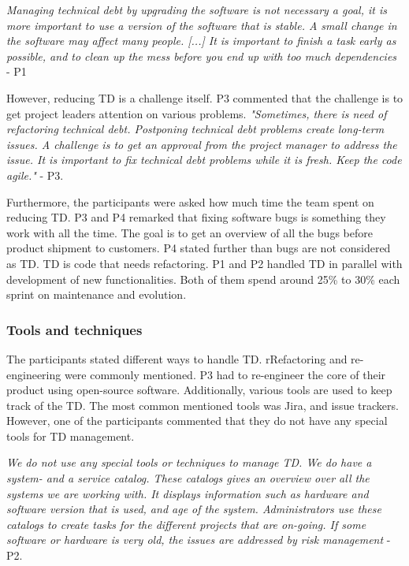 \begin{displayquote}
\textit{Managing technical debt by upgrading the software is not necessary a goal, it is more important to use a version of the software that is stable.  A small change in the software may affect many people. [...] It is important to finish a task early as possible, and to clean up the mess before you end up with too much dependencies} - P1
\end{displayquote}

However, reducing TD is a challenge itself. P3 commented that the challenge is to get project leaders attention on various problems. \textit{"Sometimes, there is need of refactoring technical debt. Postponing technical debt problems create long-term issues. A challenge is to get an approval from the project manager to address the issue. It is important to fix technical debt problems while it is fresh. Keep the code agile."} - P3. 

Furthermore, the participants were asked how much time the team spent on reducing TD. P3 and P4 remarked that fixing software bugs is something they work with all the time. The goal is to get an overview of all the bugs before product shipment to customers. P4 stated further than bugs are not considered as TD. TD is code that needs refactoring. P1 and P2 handled TD in parallel with development of new functionalities. Both of them spend around 25\% to 30\% each sprint on maintenance and evolution.


\subsubsection{Tools and techniques}
The participants stated different ways to handle TD. rRefactoring and re-engineering were commonly mentioned. P3 had to re-engineer the core of their product using open-source software. Additionally, various tools are used to keep track of the TD. The most common mentioned tools was Jira, and issue trackers. However, one of the participants commented that they do not have any special tools for TD management. 

\begin{displayquote}
	\textit{We do not use any special tools or techniques to manage TD. We do have a system- and a service catalog. These catalogs gives an overview over all the systems we are working with. It displays information such as hardware and software version that is used, and age of the system. Administrators use these catalogs to create tasks for the different projects that are on-going. If some software or hardware is very old, the issues are addressed by risk management} - P2.
\end{displayquote}

